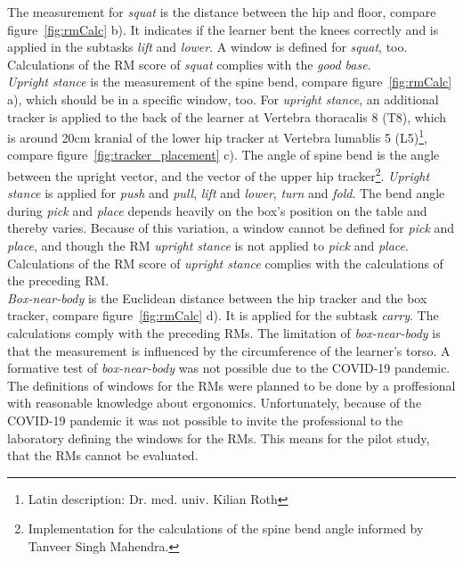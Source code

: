 The measurement for \textit{squat} is the distance between the hip and floor, compare figure~\ref{fig:rmCalc} b). It indicates if the learner bent the knees correctly and is applied in the subtasks \textit{lift} and \textit{lower}. A window is defined for \textit{squat}, too. Calculations of the RM score of \textit{squat} complies with the \textit{good base}.\\
\textit{Upright stance} is the measurement of the spine bend, compare figure~\ref{fig:rmCalc} a), which should be in a specific window, too. For \textit{upright stance}, an additional tracker is applied to the back of the learner at Vertebra thoracalis 8 (T8), which is around 20cm kranial of the lower hip tracker at Vertebra lumablis 5 (L5)\footnote{Latin description: Dr. med. univ. Kilian Roth}, compare figure~\ref{fig:tracker_placement} c). The angle of spine bend is the angle between the upright vector, and the vector of the upper hip tracker\footnote{Implementation for the calculations of the spine bend angle informed by Tanveer Singh Mahendra.}. \textit{Upright stance} is applied for \textit{push} and \textit{pull}, \textit{lift} and \textit{lower}, \textit{turn} and \textit{fold}. The bend angle during \textit{pick} and \textit{place} depends heavily on the box's position on the table and thereby varies. Because of this variation, a window cannot be defined for \textit{pick} and \textit{place}, and though the RM \textit{upright stance} is not applied to \textit{pick} and \textit{place}. Calculations of the RM score of \textit{upright stance} complies with the calculations of the preceding RM.\\
\textit{Box-near-body} is the Euclidean distance between the hip tracker and the box tracker, compare figure~\ref{fig:rmCalc} d). It is applied for the subtask \textit{carry}. The calculations comply with the preceding RMs. The limitation of \textit{box-near-body} is that the measurement is influenced by the circumference of the learner's torso. A formative test of \textit{box-near-body} was not possible due to the COVID-19 pandemic.\\

The definitions of windows for the RMs were planned to be done by a proffesional with reasonable knowledge about ergonomics. Unfortunately, because of the COVID-19 pandemic it was not possible to invite the professional to the laboratory defining the windows for the RMs. This means for the pilot study, that the RMs cannot be evaluated.

